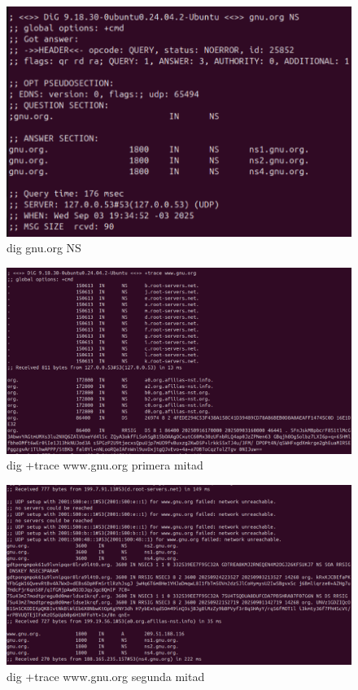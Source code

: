 \documentclass{article}
\begin{document}
\begin{figure}
    \centering
    \includegraphics[width=1\linewidth]{Fotos/SegundoDig.png}
    \caption{dig gnu.org NS}
\end{figure}

\begin{figure}
    \centering
    \includegraphics[width=1.25\linewidth]{Fotos/digtrace1.png}
    \caption{dig +trace www.gnu.org primera mitad}
\end{figure}

\begin{figure}
    \centering
    \includegraphics[width=1.25\linewidth]{Fotos/digtrace2.png}
    \caption{dig +trace www.gnu.org segunda mitad}
\end{figure}
\end{document}

